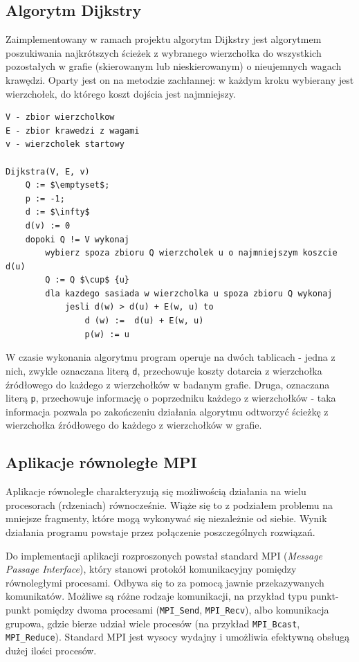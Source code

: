 \documentclass[12pt]{article}
\begin{document}
\subsection{Algorytm Dijkstry}
Zaimplementowany w ramach projektu algorytm Dijkstry jest algorytmem poszukiwania najkrótszych ścieżek z wybranego wierzchołka do wszystkich pozostałych w grafie (skierowanym lub nieskierowanym) o nieujemnych wagach krawędzi. Oparty jest on na metodzie zachłannej: w każdym kroku wybierany jest wierzchołek, do którego koszt dojścia jest najmniejszy. 

\begin{lstlisting}[caption={Pseudokod algorytmu Dijkstry.}, captionpos=b, mathescape=true, basicstyle=\scriptsize]
V - zbior wierzcholkow
E - zbior krawedzi z wagami
v - wierzcholek startowy

Dijkstra(V, E, v)
    Q := $\emptyset$;
    p := -1;
    d := $\infty$
    d(v) := 0
    dopoki Q != V wykonaj
        wybierz spoza zbioru Q wierzcholek u o najmniejszym koszcie d(u)
        Q := Q $\cup$ {u}
        dla kazdego sasiada w wierzcholka u spoza zbioru Q wykonaj
            jesli d(w) > d(u) + E(w, u) to
                d (w) :=  d(u) + E(w, u)
                p(w) := u
\end{lstlisting}

W czasie wykonania algorytmu program operuje na dwóch tablicach - jedna z nich, zwykle oznaczana literą \lstinline{d}, przechowuje koszty dotarcia z wierzchołka źródłowego do każdego z wierzchołków w badanym grafie. Druga, oznaczana literą \lstinline{p}, przechowuje informację o poprzedniku każdego z wierzchołków - taka informacja pozwala po zakończeniu działania algorytmu odtworzyć ścieżkę z wierzchołka źródłowego do każdego z wierzchołków w grafie.

\subsection{Aplikacje równoległe MPI}
Aplikacje równoległe charakteryzują się możliwością działania na wielu procesorach (rdzeniach) równocześnie. Wiąże się to z podziałem problemu na mniejsze fragmenty, które mogą wykonywać się niezależnie od siebie. Wynik działania programu powstaje przez połączenie poszczególnych rozwiązań.

Do implementacji aplikacji rozproszonych powstał standard MPI (\textit{Message Passage Interface}), który stanowi protokół komunikacyjny pomiędzy równoległymi procesami. Odbywa się to za pomocą jawnie przekazywanych komunikatów. Możliwe są różne rodzaje komunikacji, na przykład typu punkt-punkt pomiędzy dwoma procesami (\lstinline|MPI_Send|, \lstinline|MPI_Recv|), albo komunikacja grupowa, gdzie bierze udział wiele procesów (na przykład \lstinline|MPI_Bcast|, \lstinline|MPI_Reduce|). Standard MPI jest wysocy wydajny i umożliwia efektywną obsługą dużej ilości procesów.
\end{document}

